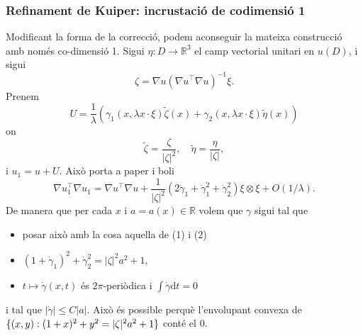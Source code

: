 \subsubsection{Refinament de Kuiper: incrustació de codimensió 1}
Modificant la forma de la correcció, podem aconseguir la mateixa construcció amb només co-dimensió 1. Sigui $\eta:D\to\mathbb R^{3}$ el camp vectorial unitari en $u(D)$, i sigui
$$\zeta = \nabla u (\nabla u^\intercal \nabla u)^{-1}\xi.$$
Prenem 
$$U = \frac1\lambda \left( \gamma_{1}(x, \lambda x \cdot \xi)\tilde{\zeta}(x) + \gamma_{2}(x, \lambda x \cdot \xi)\tilde{\eta}(x) \right)$$
on 
$$\tilde{\zeta} = \frac{\zeta}{|\zeta|^2}, \quad \tilde{\eta} = \frac{\eta}{|\zeta|},$$
i $u_1 = u + U$. Això porta a 
{\color{blue} paper i boli}
$$\nabla u_1^\intercal \nabla u_1 = \nabla u^\intercal \nabla u +\frac{1}{|\zeta|^2}\left( 2\dot\gamma_{1} + \dot\gamma_1^2 + \dot\gamma_{2}^2 \right) \xi \otimes \xi + O(1/\lambda).$$
De manera que per cada $x$ i $a=a(x)\in\mathbb R$ volem que $\gamma$ sigui tal que
\begin{itemize}
    \item {\color{blue} posar això amb la cosa aquella de (1) i (2)}
    \item $(1+\dot\gamma_1)^2+\dot\gamma_2^2=|\zeta|^2a^2+1$,
    \item $t \mapsto \dot\gamma(x,t)$ és $2\pi$-periòdica i $\int\dot\gamma\textrm{d}t=0$
\end{itemize}
i tal que $|\dot\gamma|\le C|a|$. Això és possible perquè l'envolupant convexa de $\{(x,y):(1+x)^2+y^2 = |\zeta|^2a^2+1\}$ conté el $0$. 




\newpage